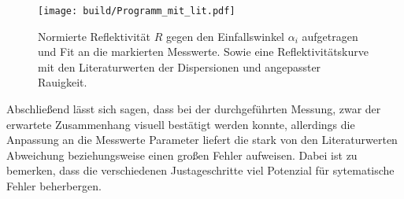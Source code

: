 \begin{figure}
 \centering
   \texttt{[image: build/Programm\_mit\_lit.pdf]}
   \caption{Normierte Reflektivität $R$ gegen den Einfallswinkel $\alpha_i$ aufgetragen und
    Fit an die markierten Messwerte. Sowie eine Reflektivitätskurve mit den Literaturwerten der Dispersionen und angepasster Rauigkeit.}
   \label{fig:messung}
\end{figure}

Abschließend lässt sich sagen, dass bei der durchgeführten Messung, zwar
der erwartete Zusammenhang visuell bestätigt werden konnte, allerdings die
Anpassung an die Messwerte Parameter liefert die stark von den Literaturwerten
Abweichung beziehungsweise einen großen Fehler aufweisen.
Dabei ist zu bemerken, dass die verschiedenen Justageschritte viel Potenzial
für sytematische Fehler beherbergen.











%
%
